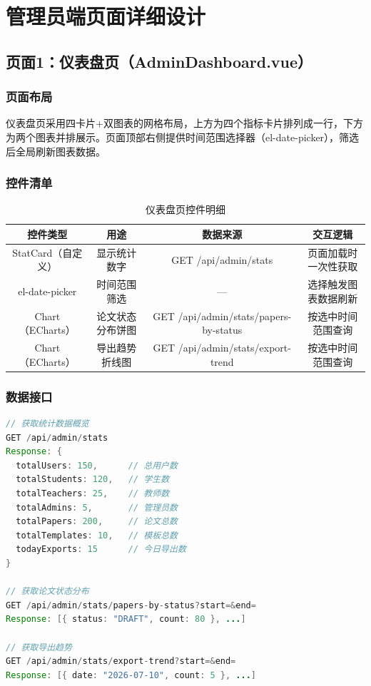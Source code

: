 
\section{管理员端页面详细设计}

\subsection{页面1：仪表盘页（AdminDashboard.vue）}

\subsubsection{页面布局}
仪表盘页采用四卡片+双图表的网格布局，上方为四个指标卡片排列成一行，下方为两个图表并排展示。页面顶部右侧提供时间范围选择器（el-date-picker），筛选后全局刷新图表数据。

\subsubsection{控件清单}
\begin{table}[htbp]
\centering
\caption{仪表盘页控件明细}
\label{tab:admin_dashboard}
\begin{tabular}{|c|c|c|c|}
\hline
\textbf{控件类型} & \textbf{用途} & \textbf{数据来源} & \textbf{交互逻辑} \\
\hline
StatCard（自定义） & 显示统计数字 & GET /api/admin/stats & 页面加载时一次性获取 \\
\hline
el-date-picker & 时间范围筛选 & — & 选择触发图表数据刷新 \\
\hline
Chart（ECharts） & 论文状态分布饼图 & GET /api/admin/stats/papers-by-status & 按选中时间范围查询 \\
\hline
Chart（ECharts） & 导出趋势折线图 & GET /api/admin/stats/export-trend & 按选中时间范围查询 \\
\hline
\end{tabular}
\end{table}

\subsubsection{数据接口}
\begin{lstlisting}[language=Java,caption={仪表盘数据接口定义}]
// 获取统计数据概览
GET /api/admin/stats
Response: {
  totalUsers: 150,      // 总用户数
  totalStudents: 120,   // 学生数
  totalTeachers: 25,    // 教师数
  totalAdmins: 5,       // 管理员数
  totalPapers: 200,     // 论文总数
  totalTemplates: 10,   // 模板总数
  todayExports: 15      // 今日导出数
}

// 获取论文状态分布
GET /api/admin/stats/papers-by-status?start=&end=
Response: [{ status: "DRAFT", count: 80 }, ...]

// 获取导出趋势
GET /api/admin/stats/export-trend?start=&end=
Response: [{ date: "2026-07-10", count: 5 }, ...]
\end{lstlisting}

